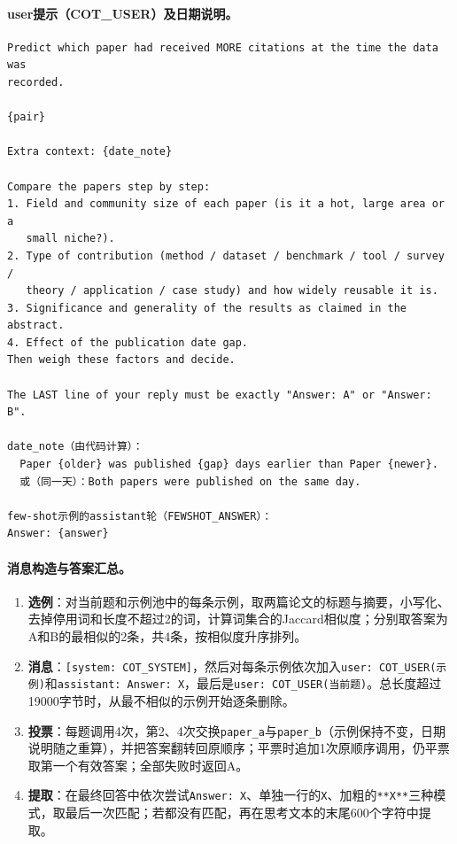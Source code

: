 \documentclass{article}
\begin{document}
\paragraph{user提示（COT\_USER）及日期说明。}
\begin{Verbatim}[fontsize=\small,frame=single]
Predict which paper had received MORE citations at the time the data was
recorded.

{pair}

Extra context: {date_note}

Compare the papers step by step:
1. Field and community size of each paper (is it a hot, large area or a
   small niche?).
2. Type of contribution (method / dataset / benchmark / tool / survey /
   theory / application / case study) and how widely reusable it is.
3. Significance and generality of the results as claimed in the abstract.
4. Effect of the publication date gap.
Then weigh these factors and decide.

The LAST line of your reply must be exactly "Answer: A" or "Answer: B".

date_note（由代码计算）：
  Paper {older} was published {gap} days earlier than Paper {newer}.
  或（同一天）：Both papers were published on the same day.

few-shot示例的assistant轮（FEWSHOT_ANSWER）：
Answer: {answer}
\end{Verbatim}

\paragraph{消息构造与答案汇总。}
\begin{enumerate}
\item \textbf{选例}：对当前题和示例池中的每条示例，取两篇论文的标题与摘要，小写化、去掉停用词和长度不超过2的词，计算词集合的Jaccard相似度；分别取答案为A和B的最相似的2条，共4条，按相似度升序排列。
\item \textbf{消息}：\texttt{[system: COT\_SYSTEM]}，然后对每条示例依次加入\texttt{user: COT\_USER(示例)}和\texttt{assistant: Answer: X}，最后是\texttt{user: COT\_USER(当前题)}。总长度超过19000字节时，从最不相似的示例开始逐条删除。
\item \textbf{投票}：每题调用4次，第2、4次交换\texttt{paper\_a}与\texttt{paper\_b}（示例保持不变，日期说明随之重算），并把答案翻转回原顺序；平票时追加1次原顺序调用，仍平票取第一个有效答案；全部失败时返回A。
\item \textbf{提取}：在最终回答中依次尝试\texttt{Answer: X}、单独一行的\texttt{X}、加粗的\texttt{**X**}三种模式，取最后一次匹配；若都没有匹配，再在思考文本的末尾600个字符中提取。
\end{enumerate}
\end{document}
